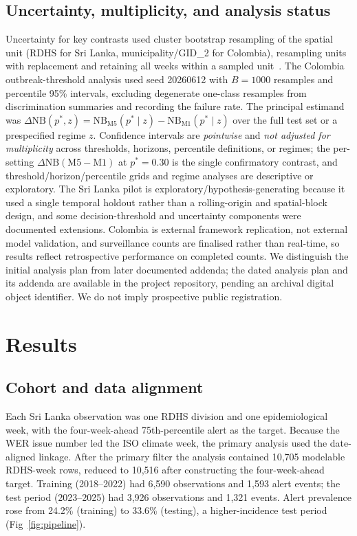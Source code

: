 \documentclass[11pt,a4paper]{article}
\begin{document}
\subsection{Uncertainty, multiplicity, and analysis status}
Uncertainty for key contrasts used cluster bootstrap resampling of the spatial unit (RDHS for Sri Lanka, municipality/GID\_2 for Colombia), resampling units with replacement and retaining all weeks within a sampled unit~\cite{CameronGelbachMiller2008}. The Colombia outbreak-threshold analysis used seed 20260612 with $B=1000$ resamples and percentile 95\% intervals, excluding degenerate one-class resamples from discrimination summaries and recording the failure rate. The principal estimand was $\Delta\mathrm{NB}(p^*,z)=\mathrm{NB}_{\mathrm{M5}}(p^*\mid z)-\mathrm{NB}_{\mathrm{M1}}(p^*\mid z)$ over the full test set or a prespecified regime $z$. Confidence intervals are \emph{pointwise} and \emph{not adjusted for multiplicity} across thresholds, horizons, percentile definitions, or regimes; the per-setting $\Delta\mathrm{NB}(\text{M5}-\text{M1})$ at $p^*=0.30$ is the single confirmatory contrast, and threshold/horizon/percentile grids and regime analyses are descriptive or exploratory. The Sri Lanka pilot is exploratory/hypothesis-generating because it used a single temporal holdout rather than a rolling-origin and spatial-block design, and some decision-threshold and uncertainty components were documented extensions. Colombia is external framework replication, not external model validation, and surveillance counts are finalised rather than real-time, so results reflect retrospective performance on completed counts. We distinguish the initial analysis plan from later documented addenda; the dated analysis plan and its addenda are available in the project repository, pending an archival digital object identifier. We do not imply prospective public registration.

\section{Results}

\subsection{Cohort and data alignment}
Each Sri Lanka observation was one RDHS division and one epidemiological week, with the four-week-ahead 75th-percentile alert as the target. Because the WER issue number led the ISO climate week, the primary analysis used the date-aligned linkage. After the primary filter the analysis contained 10{,}705 modelable RDHS-week rows, reduced to 10{,}516 after constructing the four-week-ahead target. Training (2018--2022) had 6{,}590 observations and 1{,}593 alert events; the test period (2023--2025) had 3{,}926 observations and 1{,}321 events. Alert prevalence rose from 24.2\% (training) to 33.6\% (testing), a higher-incidence test period (Fig~\ref{fig:pipeline}).
\end{document}
